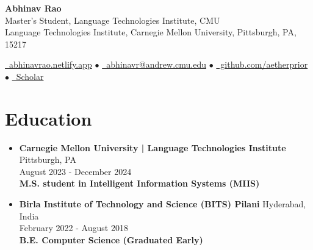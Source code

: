 \documentclass[11pt,letterpaper]{article}
\begin{document}
\begin{center}
    {\Huge\bfseries Abhinav Rao}\\[2mm]
    {\large Master's Student, Language Technologies Institute, CMU}\\[1mm]
    {\small Language Technologies Institute, Carnegie Mellon University, Pittsburgh, PA, 15217}
\end{center}

\begin{center}
\href{https://abhinavrao.netlify.app}{\faGlobe\ abhinavrao.netlify.app} $\bullet$ \href{mailto:abhinavr@andrew.cmu.edu}{\faEnvelope\ abhinavr@andrew.cmu.edu} $\bullet$ \href{https://github.com/aetherprior}{\faGithub\ github.com/aetherprior} $\bullet$ \href{https://scholar.google.com/citations?user=U_wk4ssAAAAJ}{\faGraduationCap\ Scholar}
\end{center}

\section*{Education}
\begin{itemize}[leftmargin=*,label={},itemsep=4pt]
    \item \textbf{Carnegie Mellon University | Language Technologies Institute} \hfill Pittsburgh, PA\\
        August 2023 - December 2024\\
        \textbf{\textit{} M.S. student in Intelligent Information Systems (MIIS)}
    \item \textbf{Birla Institute of Technology and Science (BITS) Pilani} \hfill Hyderabad, India\\
        February 2022 - August 2018\\
        \textbf{\textit{} B.E. Computer Science (Graduated Early)}
\end{itemize}
\end{document}
